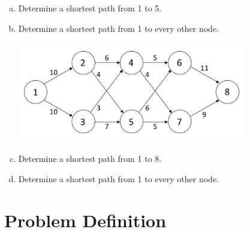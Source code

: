 \documentclass[12pt]{article}
\theoremstyle{definition}
\begin{document}
\begin{enumerate}[a.]

\item Determine a shortest path from 1 to 5.
\vfill


\item Determine a shortest path from 1 to every other node.
\vfill


\newpage
\begin{center}
\includegraphics[width=10cm]{shortestpathexample2}
\end{center}

\item Determine a shortest path from 1 to 8.
\vfill

\item Determine a shortest path from 1 to every other node.
\vfill



\end{enumerate}

\newpage


\section{Problem Definition}
\end{document}

